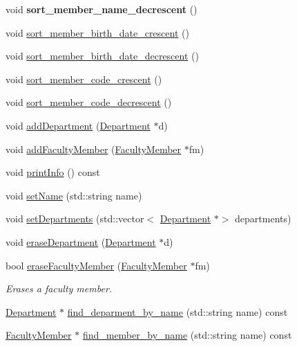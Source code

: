 \begin{DoxyCompactItemize}
void {\bfseries sort\+\_\+member\+\_\+name\+\_\+decrescent} ()
\item 
void \hyperlink{classFaculty_a524f8320d93979695e345f9701c87dd1}{sort\+\_\+member\+\_\+birth\+\_\+date\+\_\+crescent} ()
\item 
void \hyperlink{classFaculty_aa2d7fd660dda947c882c0b02bbdbdc40}{sort\+\_\+member\+\_\+birth\+\_\+date\+\_\+decrescent} ()
\item 
void \hyperlink{classFaculty_abc2a6b1d2ef54e397e47839445d57b03}{sort\+\_\+member\+\_\+code\+\_\+crescent} ()
\item 
void \hyperlink{classFaculty_affc074ff7e6ccca9def97262dc66618e}{sort\+\_\+member\+\_\+code\+\_\+decrescent} ()
\item 
void \hyperlink{classFaculty_acc553daf99e38316f5a0b38cafc2ede8}{add\+Department} (\hyperlink{classDepartment}{Department} $\ast$d)
\item 
void \hyperlink{classFaculty_a0438f29c6c9d9f7ca68fc5193f9639e3}{add\+Faculty\+Member} (\hyperlink{classFacultyMember}{Faculty\+Member} $\ast$fm)
\item 
void \hyperlink{classFaculty_aafc38827c052623298d74669ae908397}{print\+Info} () const
\item 
void \hyperlink{classFaculty_a0059fc30acc3f8d7477cde7a1e32a4d8}{set\+Name} (std\+::string name)
\item 
void \hyperlink{classFaculty_adf74199027a7cfb4d873cb72173b6e5b}{set\+Departments} (std\+::vector$<$ \hyperlink{classDepartment}{Department} $\ast$$>$ departments)
\item 
void \hyperlink{classFaculty_a887b24c4fe91d0c77c055be9473e2d88}{erase\+Department} (\hyperlink{classDepartment}{Department} $\ast$d)
\item 
bool \hyperlink{classFaculty_a780aaae0ddd89dfc175ecdf30b8d3081}{erase\+Faculty\+Member} (\hyperlink{classFacultyMember}{Faculty\+Member} $\ast$fm)
\begin{DoxyCompactList}\small\item\em Erases a faculty member. \end{DoxyCompactList}\item 
\hyperlink{classDepartment}{Department} $\ast$ \hyperlink{classFaculty_adbd64c7f09530fe481586b3d059e237f}{find\+\_\+deparment\+\_\+by\+\_\+name} (std\+::string name) const
\item 
\hyperlink{classFacultyMember}{Faculty\+Member} $\ast$ \hyperlink{classFaculty_ae5b2d7446d9a91bdc1599fee00ee4e6a}{find\+\_\+member\+\_\+by\+\_\+name} (std\+::string name) const
\item 
$$
\end{DoxyCompactItemize}
